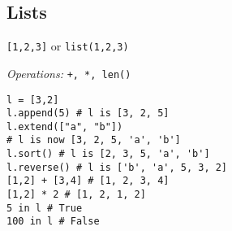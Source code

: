 \subsection{Lists}
\texttt{[1,2,3]} or \texttt{list(1,2,3)}

\textit{Operations:} \texttt{+, *, len()}
\begin{lstlisting}
l = [3,2]
l.append(5) # l is [3, 2, 5]
l.extend(["a", "b"]) 
# l is now [3, 2, 5, 'a', 'b']
l.sort() # l is [2, 3, 5, 'a', 'b']
l.reverse() # l is ['b', 'a', 5, 3, 2]
[1,2] + [3,4] # [1, 2, 3, 4]
[1,2] * 2 # [1, 2, 1, 2]
5 in l # True
100 in l # False
\end{lstlisting}
